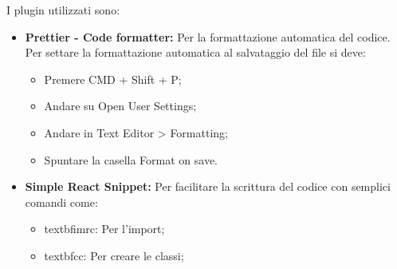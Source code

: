 I plugin utilizzati sono:
\begin{itemize}
	\item \textbf{Prettier - Code formatter:} Per la formattazione automatica del codice.
	Per settare la formattazione automatica al salvataggio del file si deve:
	\begin{itemize}
		\item Premere CMD + Shift + P;
		\item Andare su Open User Settings;
		\item Andare in Text Editor > Formatting;
		\item Spuntare la casella Format on save.
	\end{itemize}
	\item \textbf{Simple React Snippet:} Per facilitare la scrittura del codice con semplici comandi come:
	\begin{itemize}
		\item textbf{imrc:} Per l'import;
		\item textbf{cc:} Per creare le classi;
		
	\end{itemize}
\end{itemize}

